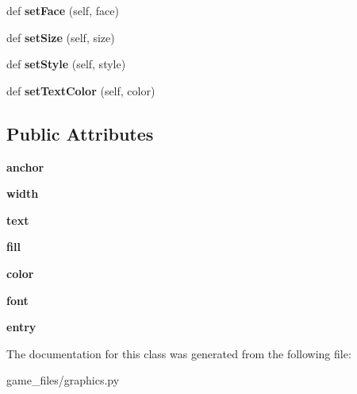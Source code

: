 \begin{DoxyCompactItemize}
\item 
def {\bfseries set\+Face} (self, face)\hypertarget{classgraphics_1_1Entry_abaaf60215354bfbcecbd506e7176d54b}{}\label{classgraphics_1_1Entry_abaaf60215354bfbcecbd506e7176d54b}

\item 
def {\bfseries set\+Size} (self, size)\hypertarget{classgraphics_1_1Entry_a0e4a339c1fa89e228f750b7d5c6d8ced}{}\label{classgraphics_1_1Entry_a0e4a339c1fa89e228f750b7d5c6d8ced}

\item 
def {\bfseries set\+Style} (self, style)\hypertarget{classgraphics_1_1Entry_aa36a5f9e71331b921f0728c25631d9c3}{}\label{classgraphics_1_1Entry_aa36a5f9e71331b921f0728c25631d9c3}

\item 
def {\bfseries set\+Text\+Color} (self, color)\hypertarget{classgraphics_1_1Entry_a44e4c12f4ec190351fc8dc29bf7f0a37}{}\label{classgraphics_1_1Entry_a44e4c12f4ec190351fc8dc29bf7f0a37}

\end{DoxyCompactItemize}
\subsection*{Public Attributes}
\begin{DoxyCompactItemize}
\item 
{\bfseries anchor}\hypertarget{classgraphics_1_1Entry_a80e7267b0c2117459d13532c253e608f}{}\label{classgraphics_1_1Entry_a80e7267b0c2117459d13532c253e608f}

\item 
{\bfseries width}\hypertarget{classgraphics_1_1Entry_a3c71a6cb1110ae9da3edef095fbb61e5}{}\label{classgraphics_1_1Entry_a3c71a6cb1110ae9da3edef095fbb61e5}

\item 
{\bfseries text}\hypertarget{classgraphics_1_1Entry_ad606e7fd6c89a56ffd6c35385bc050e6}{}\label{classgraphics_1_1Entry_ad606e7fd6c89a56ffd6c35385bc050e6}

\item 
{\bfseries fill}\hypertarget{classgraphics_1_1Entry_aaa0a15f51427af10dd5adc7e0aa3d553}{}\label{classgraphics_1_1Entry_aaa0a15f51427af10dd5adc7e0aa3d553}

\item 
{\bfseries color}\hypertarget{classgraphics_1_1Entry_a96d564c2ac5f5bc21e6353f7b6e702c1}{}\label{classgraphics_1_1Entry_a96d564c2ac5f5bc21e6353f7b6e702c1}

\item 
{\bfseries font}\hypertarget{classgraphics_1_1Entry_a03940868372e90882d320d9a402dec14}{}\label{classgraphics_1_1Entry_a03940868372e90882d320d9a402dec14}

\item 
{\bfseries entry}\hypertarget{classgraphics_1_1Entry_a344bdacc19d9c10e355e21357a94c38d}{}\label{classgraphics_1_1Entry_a344bdacc19d9c10e355e21357a94c38d}

\end{DoxyCompactItemize}


The documentation for this class was generated from the following file\+:\begin{DoxyCompactItemize}
\item 
game\+\_\+files/graphics.\+py\end{DoxyCompactItemize}
